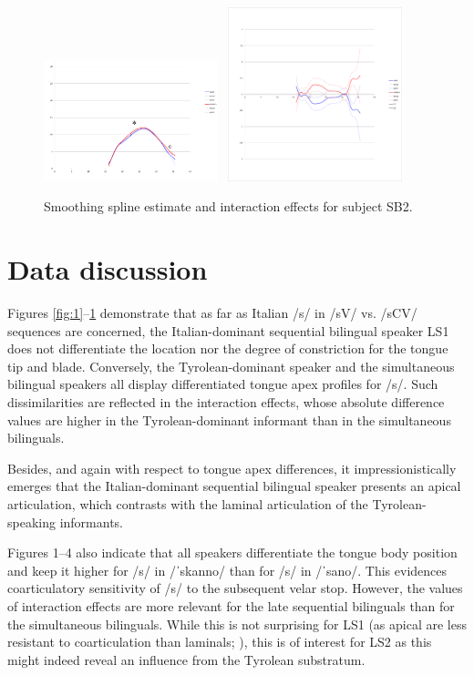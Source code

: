 \documentclass[output=paper]{LSP/langsci}
\begin{document}
\begin{figure}
\includegraphics[width=0.45\textwidth]{illustrations/sprea_fig4a}~
\includegraphics[width=0.45\textwidth,trim=4 42 4 12,clip]{illustrations/sprea_fig4b}
\caption{Smoothing spline estimate and interaction effects for subject SB2.}
\label{fig:4}   
\end{figure}

\section{Data discussion}
Figures \ref{fig:1}--\ref{fig:4} demonstrate that as far as Italian /s/ in /sV/ vs. /sCV/ sequences are concerned, the Italian-dominant sequential bilingual speaker LS1 does not differentiate the location nor the degree of constriction for the tongue tip and blade. Conversely, the Tyrolean-dominant speaker and the simultaneous bilingual speakers all display differentiated tongue apex profiles for /s/. Such dissimilarities are reflected in the interaction effects, whose absolute difference values are higher in the Tyrolean-dominant informant than in the simultaneous bilinguals.

Besides, and again with respect to tongue apex differences, it impressionistically emerges that the Italian-dominant sequential bilingual speaker presents an apical articulation, which contrasts with the laminal articulation of the Tyrolean-speaking informants.

Figures 1--4 also indicate that all speakers differentiate the tongue body position and keep it higher for /s/ in /ˈskanno/ than for /s/ in /ˈsano/. This evidences coarticulatory sensitivity of /s/ to the subsequent velar stop. However, the values of interaction effects are more relevant for the late sequential bilinguals than for the simultaneous bilinguals. While this is not surprising for LS1 (as apical  are less resistant to coarticulation than laminals; \citealt{hardcastle_lingual_1999}), this is of interest for LS2 as this might indeed reveal an influence from the Tyrolean substratum.
\end{document}
